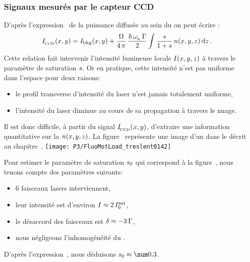 \subsubsection{Signaux mesurés par le capteur CCD}
\noindent
D'après l'expression~ de la puissance diffusée au sein du \nat on peut écrire :
\begin{equation}
	\Iccdxy 
	=  \Ibackxy
	  + \FractionAngleSolide
	\, \frac{\hbar\,\pulsReso\,\pulsSpont}{2}
	\, \Integrale{\frac{\sat}{1+\sat} \, \densxyz}{\dz}
	\pointformule
	\label{eq:IccdFluo}
\end{equation} 
Cette relation fait intervenir l'intensité lumineuse locale ${{I}(x,y,z)}$ à travers le paramètre de saturation ${s}$. Or en pratique, cette intensité n'est pas uniforme dans l'espace pour deux raisons:
\begin{itemize}
	\item le profil transverse d'intensité du laser n'est jamais totalement uniforme,
	\item l'intensité du laser diminue au cours de sa propagation à travers le nuage.
\end{itemize}
Il est donc difficile, à partir du signal ${{I_{_{\hspace{-1pt}{\rm CCD}}}}(x,y)}$, d'extraire une information quantitative sur la \dat ${{n}(x,y,z)}$.
%
%
La figure~ représente une image d'un \n dans le \pmo décrit au chapitre~. 
%
\bfighs
\texttt{[image: P3/FluoMotLoad\_treslent0142]}
\label{fig:ImagesFluo}
\efigh

\casse

\noindent
Pour estimer le paramètre de saturation ${s}_0$ qui correspond à la figure~, nous tenons compte des paramètres suivants:
\begin{itemize}
	\item 6 faisceaux lasers interviennent,%
	\item leur intensité est d'environ $I\approx2\,{I^{\rm sat}_{0}}$,
	\item le désaccord des faisceaux est ${\delta}\approx-3\,{\Gamma}$,
	\item nous négligeons l'inhomogénéité du \chm.
\end{itemize}
D'après l'expression~, nous déduisons $\sat_0 \approx \val{0.3}$.



